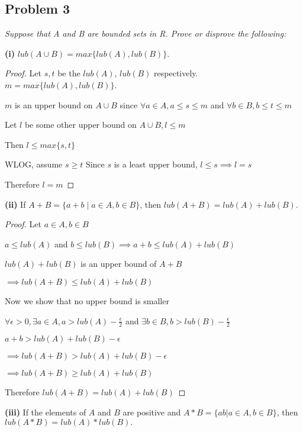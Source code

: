 \documentclass[12pt, a4paper]{article}
\begin{document}
    \subsection*{Problem 3}
    \textit{Suppose that A and B are bounded sets in R. Prove or disprove the following:}
        
    \noindent \textbf{(i)} $lub(A \cup B) = max\{lub(A), lub(B)\}.$
        \begin{proof}
            Let $s,t $ be the $lub(A)$, $lub(B)$ respectively. $m = max\{lub(A), lub(B)\}$. 
            
            $m$ is an upper bound on $A \cup B$ since $\forall a\in A , a \le s \le m$ and $\forall b\in B, b \le t \le m$ 

            Let $l$ be some other upper bound on $A \cup B, l \le m$

            Then $l \le max\{s,t\}$

            WLOG, assume $s \ge t$ Since $s$ is a least upper bound, $l \le s \implies l=s$
            
            Therefore $l=m$
        \end{proof}
    \noindent \textbf{(ii)} If $A + B = \{a + b \mid a \in A, b \in B \}$, then $lub(A + B) = lub(A) + lub(B)$.
        \begin{proof}
            Let $a\in A, b\in B$ 

            $a\le lub(A)$ and $b\le lub(B) \implies a+b \le lub(A) + lub(B)$ 
            
            $lub(A)+lub(B)$ is an upper bound of $A+B$ 

            $\implies lub(A+B) \le lub(A)+lub(B)$

            Now we show that no upper bound is smaller

            $\forall \epsilon > 0, \exists a\in A, a > lub(A)-\frac{\epsilon}{2}$ and $\exists b\in B, b > lub(B)-\frac{\epsilon}{2}$

            $a+b > lub(A)+lub(B)-\epsilon$

            $\implies lub(A+B) > lub(A)+lub(B)-\epsilon$

            $\implies lub(A+B) \ge lub(A)+lub(B)$

            Therefore $lub(A+B) = lub(A)+lub(B)$

        \end{proof}
    \noindent \textbf{(iii)} If the elements of $A$ and $B$ are positive and $A*B = \{ab | a \in A, b \in B\}$, then $lub(A * B) = lub(A)*lub(B).$
\end{document}
